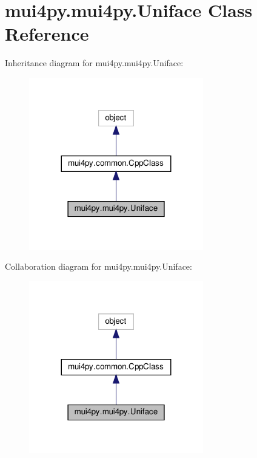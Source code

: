 \hypertarget{classmui4py_1_1mui4py_1_1_uniface}{}\section{mui4py.\+mui4py.\+Uniface Class Reference}
\label{classmui4py_1_1mui4py_1_1_uniface}


Inheritance diagram for mui4py.\+mui4py.\+Uniface\+:
\nopagebreak
\begin{figure}[H]
\begin{center}
\leavevmode
\includegraphics[width=215pt]{classmui4py_1_1mui4py_1_1_uniface__inherit__graph}
\end{center}
\end{figure}


Collaboration diagram for mui4py.\+mui4py.\+Uniface\+:
\nopagebreak
\begin{figure}[H]
\begin{center}
\leavevmode
\includegraphics[width=215pt]{classmui4py_1_1mui4py_1_1_uniface__coll__graph}
\end{center}
\end{figure}
